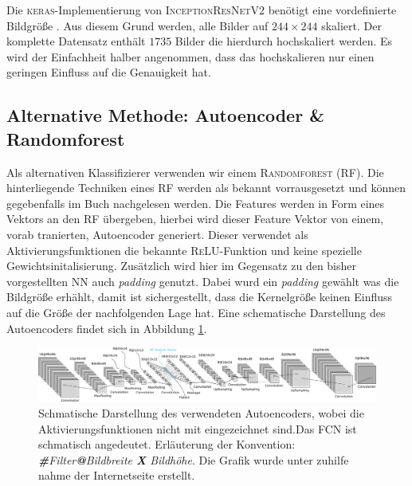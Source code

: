 Die \textsc{keras}-Implementierung von \textsc{InceptionResNetV2} benötigt
eine vordefinierte Bildgröße \cite{keras_InceptionResNetV2}.
Aus diesem Grund werden, alle Bilder auf $244\times 244$ skaliert.
Der komplette Datensatz enthält $1735$ Bilder die hierdurch hochskaliert werden.
Es wird der Einfachheit halber angenommen, dass das hochskalieren nur einen
geringen Einfluss auf die Genauigkeit hat.

\subsection{Alternative Methode: Autoencoder \& Randomforest}
Als alternativen Klassifizierer verwenden wir einem \textsc{Randomforest} (RF).
Die hinterliegende Techniken eines RF werden als bekannt vorrausgesetzt und können
gegebenfalls im Buch \cite[S. 181]{hands_on_machine_learning} nachgelesen werden.
Die Features werden in Form eines Vektors an den RF übergeben,
hierbei wird dieser Feature Vektor von einem, vorab tranierten,
Autoencoder generiert. Dieser verwendet als Aktivierungsfunktionen
die bekannte \textsc{ReLU}-Funktion und keine spezielle Gewichtsinitalisierung.
Zusätzlich wird hier im Gegensatz zu den bisher vorgestellten NN auch \emph{padding}
genutzt. Dabei wurd ein \emph{padding} gewählt was
die Bildgröße erhählt, damit ist sichergestellt, dass die Kernelgröße keinen Einfluss
auf die Größe der nachfolgenden Lage hat. Eine schematische Darstellung des Autoencoders
findet sich in Abbildung \ref{fig:Autoencoder}.
\begin{figure}
\centering
\includegraphics[width=\the\textwidth]{../../final_data/general/autoencoder.pdf}
\caption{Schmatische Darstellung des verwendeten Autoencoders, wobei
         die Aktivierungsfunktionen nicht mit eingezeichnet sind.Das FCN
         ist schmatisch angedeutet. Erläuterung der Konvention: \emph{\textbf{\#}Filter\textbf{@}Bildbreite \textbf{X} Bildhöhe}.
         Die Grafik wurde unter zuhilfe nahme der Internetseite \cite{net_svg_source} erstellt.}
\label{fig:Autoencoder}
\end{figure}
